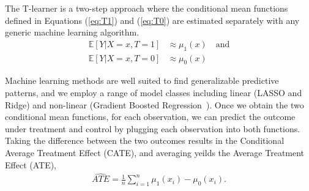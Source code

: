 \documentclass[12pt, a4paper]{article}
\begin{document}
The T-learner is a two-step approach where the conditional mean functions defined in Equations (\ref{eq:T1}) and (\ref{eq:T0}) are estimated separately with any generic machine learning algorithm.
\begin{align}
  \mathbb{E}[Y|X{=}x, T{=}1] &\approx \mu_1(x) \quad \textrm{and} \label{eq:T1} \\
  \mathbb{E}[Y|X{=}x, T{=}0] &\approx \mu_0(x) \label{eq:T0}
\end{align}

Machine learning methods are well suited to find generalizable predictive patterns, and we employ a range of model classes including linear (LASSO and Ridge) and non-linear (Gradient Boosted Regression~\citep{friedman2001}). Once we obtain the two conditional mean functions, for each observation, we can predict the outcome under treatment and control by plugging each observation into both functions. Taking the difference between the two outcomes results in the Conditional Average Treatment Effect (CATE), and averaging yeilds the Average Treatment Effect (ATE),
\begin{align}
  \hat{ATE} = \frac{1}{n} \sum^n_{i=1} \mu_1(x_i) - \mu_0(x_i).
\end{align}
%
%
\end{document}

